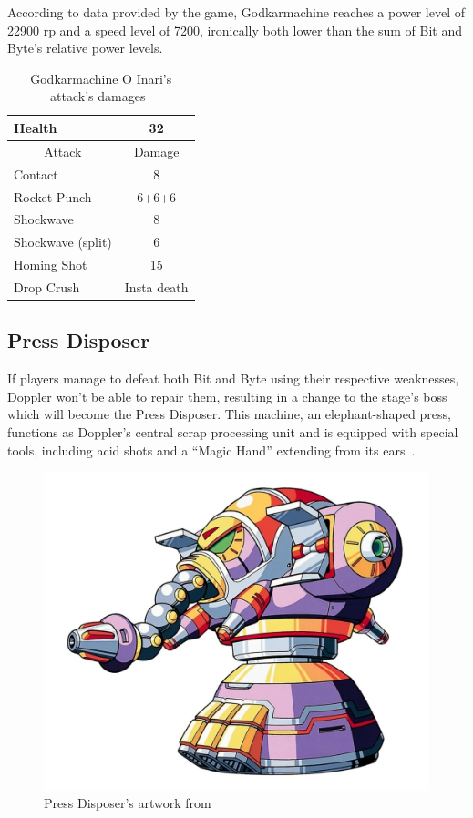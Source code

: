According to data provided by the game, Godkarmachine reaches a power level of 22900 rp and a speed level of 7200, ironically both lower than the sum of Bit and Byte's relative power levels.

\begin{table}[htp]
	\centering
	\begin{tabular}[h]{l c}
		\toprule
		Health  & 32\\
		\midrule
		\multicolumn{1}{c}{Attack} & \multicolumn{1}{c}{Damage}\\
		Contact & 8\\
		Rocket Punch& 6+6+6\\
		Shockwave& 8\\
		Shockwave (split)& 6\\
		Homing Shot& 15\\
		Drop Crush& Insta death\\
		\bottomrule
	\end{tabular}
	\caption{Godkarmachine O Inari's attack's damages~\cite{wiki:Godkarmachine,book:Compendium}}
\end{table} 


\subsection{Press Disposer}\label{boss:Press_disposer}

If players manage to defeat both Bit and Byte using their respective weaknesses, Doppler won't be able to repair them, resulting in a change to the stage's boss which will become the Press Disposer. This machine, an elephant-shaped press, functions as Doppler's central scrap processing unit and is equipped with special tools, including acid shots and a ``Magic Hand'' extending from its ears~\cite{wayback:X3_resources}.
\begin{figure}[htp]
	\centering
	\includegraphics[height=\portraitsize]{figures/X3/Doppler_stages/pressdisposer.png}
	\caption{Press Disposer's artwork from~\cite{book:MMX_Complete_art} }
\end{figure}



